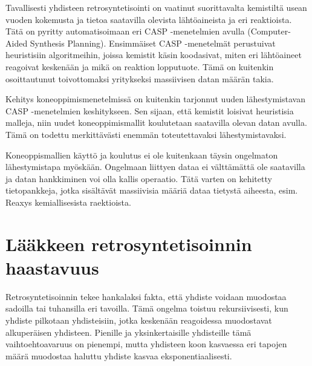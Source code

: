 \documentclass[finnish,twoside,censored,tkt,sw-line]{HYthesisML}
\begin{document}
Tavallisesti yhdisteen retrosyntetisointi on vaatinut suorittavalta kemistiltä usean vuoden kokemusta ja tietoa saatavilla olevista lähtöaineista ja eri reaktioista.
Tätä on pyritty automatisoimaan eri CASP -menetelmien avulla (Computer-Aided Synthesis Planning).
Ensimmäiset CASP -menetelmät perustuivat heuristisiin algoritmeihin, joissa kemistit käsin koodasivat, miten eri lähtöaineet reagoivat keskenään ja mikä on reaktion lopputuote.
Tämä on kuitenkin osoittautunut toivottomaksi yritykseksi massiivisen datan määrän takia.

Kehitys koneoppimismenetelmissä on kuitenkin tarjonnut uuden lähestymistavan CASP -menetelmien keshitykseen.
Sen sijaan, että kemistit loisivat heuristisia malleja, niin uudet koneoppimismallit koulutetaan saatavilla olevan datan avulla.
Tämä on todettu merkittävästi enemmän toteutettavaksi lähestymistavaksi.

Koneoppismallien käyttö ja koulutus ei ole kuitenkaan täysin ongelmaton lähestymistapa myöskään.
Ongelmaan liittyen dataa ei välttämättä ole saatavilla ja datan hankkiminen voi olla kallis operaatio.
Tätä varten on kehitetty tietopankkeja, jotka sisältävät massiivisia määriä dataa tietystä aiheesta, esim. Reaxys kemiallisesista raektioista.


\section{Lääkkeen retrosyntetisoinnin haastavuus}

Retrosyntetisoinnin tekee hankalaksi fakta, että yhdiste voidaan muodostaa sadoilla tai tuhansilla eri tavoilla.
Tämä ongelma toistuu rekursiivisesti, kun yhdiste pilkotaan yhdisteisiin, jotka keskenään reagoidessa muodostavat alkuperäisen yhdisteen.
Pienille ja yksinkertaisille yhdisteille tämä vaihtoehtoavaruus on pienempi, mutta yhdisteen koon kasvaessa eri tapojen määrä muodostaa haluttu yhdiste kasvaa eksponentiaalisesti.
\end{document}

